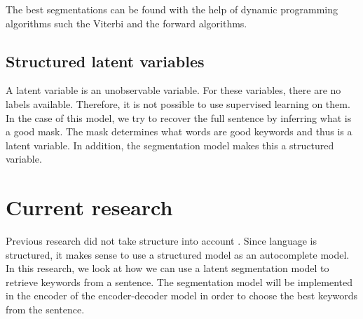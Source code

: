 The best segmentations can be found with the help of dynamic programming algorithms such the Viterbi and the forward algorithms. 

\subsection{Structured latent variables}
A latent variable is an unobservable variable.
For these variables, there are no labels available. 
Therefore, it is not possible to use supervised learning on them. 
In the case of this model, we try to recover the full sentence by inferring what is a good mask.
The mask determines what words are good keywords and thus is a latent variable. 
In addition, the segmentation model makes this a structured variable. 


\section{Current research}

Previous research did not take structure into account \cite{autocomplete, Bar-YossefZiv2011Cqa, SvyatkovskiyAlexey2019PACC}.
Since language is structured, it makes sense to use a structured model as an autocomplete model. 
In this research, we look at how we can use a latent segmentation model to retrieve keywords from a sentence. 
The segmentation model will be implemented in the encoder of the encoder-decoder model in order to choose the best keywords from the sentence.